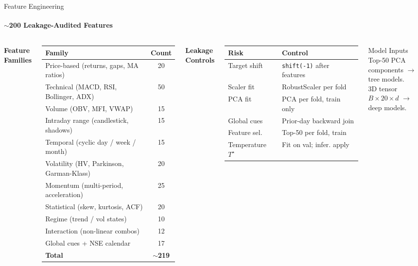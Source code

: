 \documentclass[10pt,aspectratio=43]{beamer}
\newcommand{\gd}[1]{\textcolor{secondary}{\textbf{#1}}}
\newcommand{\vsep}{\vspace{0.04cm}}
\newcommand{\AS}{\renewcommand{\arraystretch}{1.15}}
\begin{document}
\begin{frame}{Feature Engineering}
  \framesubtitle{$\sim$200 Leakage-Audited Features}
  \begin{columns}[T]
      \gd{\textbf{Feature Families}}
      \vsep
      \AS\scriptsize
      \begin{tabular}{lc}
        \toprule
        \textbf{Family} & \textbf{Count} \\
        \midrule
        Price-based (returns, gaps, MA ratios)     & 20 \\
        Technical (MACD, RSI, Bollinger, ADX)      & 50 \\
        Volume (OBV, MFI, VWAP)                    & 15 \\
        Intraday range (candlestick, shadows)       & 15 \\
        Temporal (cyclic day / week / month)        & 15 \\
        Volatility (HV, Parkinson, Garman-Klass)   & 20 \\
        Momentum (multi-period, acceleration)       & 25 \\
        Statistical (skew, kurtosis, ACF)           & 20 \\
        Regime (trend / vol states)                 & 10 \\
        Interaction (non-linear combos)             & 12 \\
        Global cues + NSE calendar                  & 17 \\
        \midrule
        \textbf{Total}                              & $\sim$\textbf{219} \\
        \bottomrule
      \end{tabular}
      \gd{\textbf{Leakage Controls}}
      \vsep
      \AS\scriptsize
      \begin{tabular}{p{1.8cm} p{2.8cm}}
        \toprule
        \textbf{Risk} & \textbf{Control} \\
        \midrule
        Target shift      & \texttt{shift(-1)} after features \\
        Scaler fit        & RobustScaler per fold \\
        PCA fit           & PCA per fold, train only \\
        Global cues       & Prior-day backward join \\
        Feature sel.      & Top-50 per fold, train \\
        Temperature $T^\star$ & Fit on val; infer. apply \\
        \bottomrule
      \end{tabular}
      \vsep
      \begin{block}{Model Inputs}
        \footnotesize
        Top-50 PCA components $\to$ tree models.\\
        3D tensor $B \times 20 \times d$ $\to$ deep models.
      \end{block}
  \end{columns}
\end{frame}
\end{document}

